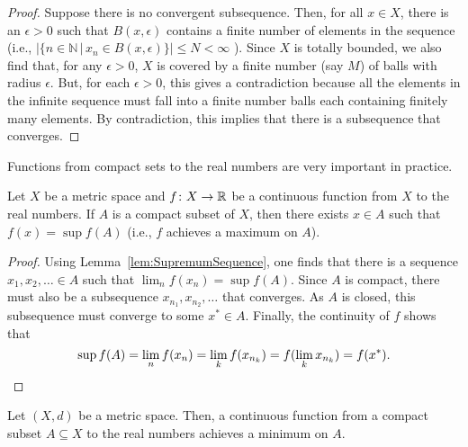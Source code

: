 \begin{proof}
Suppose there is no convergent subsequence.
Then, for all $x\in X$, there is an $\epsilon >0$ such that $B(x,\epsilon)$ contains a finite number of elements in the sequence (i.e., $|\{n\in \mathbb{N}\,|\,x_n \in B(x,\epsilon)\}| \leq N<\infty$ ).
Since $X$ is totally bounded, we also find that, for any $\epsilon >0$, $X$ is covered by a finite number (say $M$) of balls with radius $\epsilon$.
But, for each $\epsilon >0$, this gives a contradiction because all the elements in the infinite sequence must fall into a finite number balls each containing finitely many elements.
By contradiction, this implies that there is a subsequence that converges.
\fi
\end{proof}

Functions from compact sets to the real numbers are very important in practice.

\begin{theorem}
Let $X$ be a metric space and $f \colon X\rightarrow \mathbb{R}$ be a continuous function from $X$ to the real numbers.
If $A$ is a compact subset of $X$, then there exists $x\in A$ such that $f(x)=\sup f(A)$ (i.e., $f$ achieves a maximum on $A$).
\end{theorem}
\begin{proof}
Using Lemma~\ref{lem:SupremumSequence}, one finds that there is a sequence $x_1,x_2,\ldots \in A$ such that $\lim_n f(x_n) = \sup f(A)$.
Since $A$ is compact, there must also be a subsequence $x_{n_1},x_{n_2},\ldots$ that converges.
As $A$ is closed, this subsequence must converge to some $x^* \in A$.
Finally, the continuity of $f$ shows that
\[\sup f(A) = \lim_n f(x_n) = \lim_k f(x_{n_k}) = f(\lim_k x_{n_k}) = f(x^*). \qedhere \]
\end{proof}

\begin{corollary}
Let $(X,d)$ be a metric space.
Then, a continuous function from a compact subset $A\subseteq X$ to the real numbers achieves a minimum on $A$.
\end{corollary}



